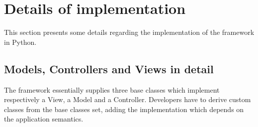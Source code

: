 
\section{\label{DI}Details of implementation}
This section presents some details regarding the implementation of the
\mvco framework in Python.

\subsection{Models, Controllers and Views in detail}
The \mvco framework essentially supplies three base classes which
implement respectively a View, a Model and a Controller.  Developers
have to derive custom classes from the base classes set, adding the
implementation which depends on the application semantics.

